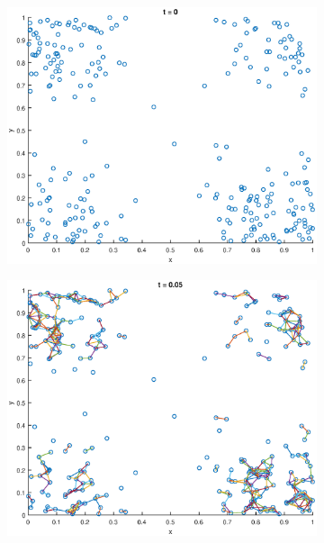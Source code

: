 \documentclass[10pt]{article}
\begin{document}
\subsection{}
\begin{figure}[H]
  \centering
  \caption{Minkowski clustering for different threshold values.}
	\begin{subfigure}[b]{.49\textwidth}
		\includegraphics[width=\columnwidth]{Ass1_0.eps}
		\caption{}
		\label{fig1a}
	\end{subfigure}  
	\begin{subfigure}[b]{.49\textwidth}
		\includegraphics[width=\columnwidth]{Ass1_5.eps}

\end{subfigure}
\end{figure}
\end{document}
